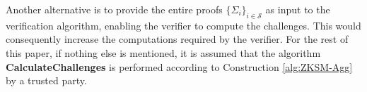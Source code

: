Another alternative is to provide the entire proofs $\{\Sigma_i\}_{i\in\mathcal{S}}$ as input to the verification algorithm, enabling the verifier to compute the challenges. This would consequently increase the computations required by the verifier. For the rest of this paper, if nothing else is mentioned, it is assumed that the algorithm \textbf{CalculateChallenges} is performed according to Construction \ref{alg:ZKSM-Agg} by a trusted party. 





 
